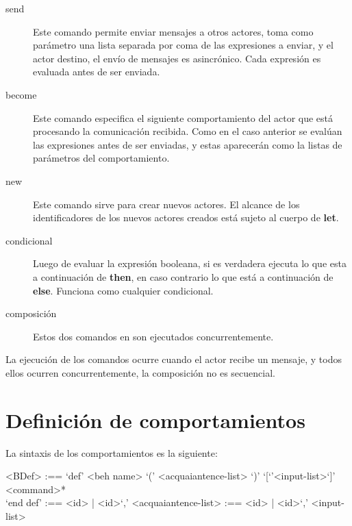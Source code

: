 \begin{description}
\item [send] Este comando permite enviar mensajes a otros actores, toma como
  parámetro una lista separada por coma de las expresiones a enviar, y el actor
  destino, el envío de mensajes es asincrónico. Cada expresión es evaluada antes
  de ser enviada.
\item [become] Este comando especifica el siguiente comportamiento del actor
  que está procesando la comunicación recibida. Como en el caso anterior se evalúan
  las expresiones antes de ser enviadas, y estas aparecerán como la listas de
  parámetros del comportamiento. 
\item[new] Este comando sirve para crear nuevos actores. El alcance de los
  identificadores de los nuevos actores creados está sujeto al cuerpo de \textbf{let}.
\item[condicional] Luego de evaluar la expresión booleana, si es verdadera
  ejecuta lo que esta a continuación de \textbf{then}, en caso contrario lo que está a
  continuación de \textbf{else}. Funciona como cualquier condicional.
\item[composición] Estos dos comandos en \SAL son ejecutados concurrentemente.
 
\end{description}

La ejecución de los comandos ocurre cuando el actor recibe un mensaje, y todos
ellos ocurren concurrentemente, la composición no es secuencial.

\section{Definición de comportamientos}

La sintaxis de los comportamientos es la siguiente:

\begin{grammar}
 <BDef> :== `def' <beh name> `(' <acquaiantence-list> `)' `[`'<input-list>`]' \\
  \quad <command>* \\
  `end def'
   :== <id> | <id>`,' <acquaiantence-list>
   :== <id> | <id>`,' <input-list>
\end{grammar}

